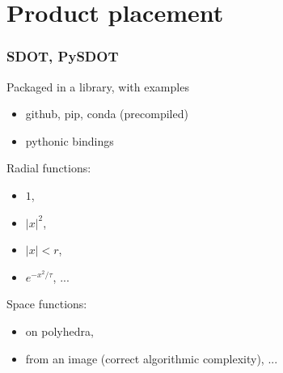 \documentclass[aspectratio=169]{beamer}
\begin{document}
\section{Product placement}

\begin{frame}
    \frametitle{SDOT, PySDOT}

    Packaged in a library, with examples
    \begin{itemize}
        \item github, pip, conda (precompiled)
        \item pythonic bindings
    \end{itemize}

    \vfill
    Radial functions:
    \begin{itemize}
        \item $1$,
        \item $|x|^2$,
        \item $|x| < r$,
        \item $e^{-x^2 / \tau}$, ...
    \end{itemize}

    \vfill
    Space functions:
    \begin{itemize}
        \item on polyhedra,
        \item from an image (correct algorithmic complexity), ...
    \end{itemize}
\end{frame}
\end{document}

